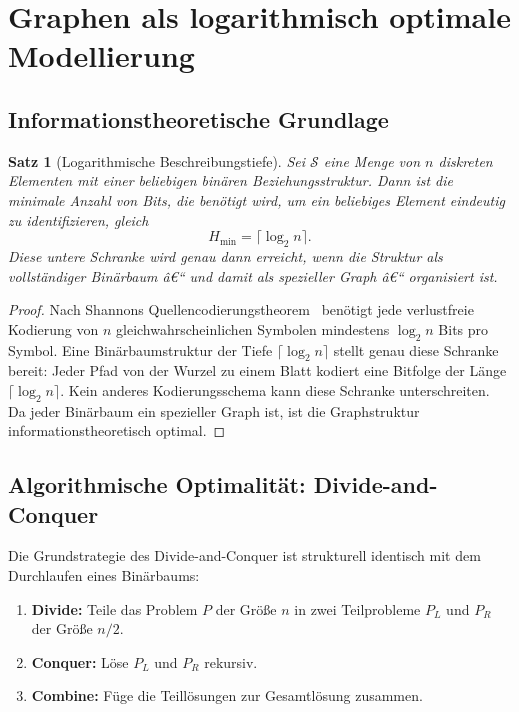 ﻿\documentclass[12pt,a4paper,twoside]{article}
\theoremstyle{definition}
\theoremstyle{plain}
\newtheorem{theorem}{Satz}[section]
\theoremstyle{remark}
\begin{document}
\section{Graphen als logarithmisch optimale Modellierung}
\label{sec:log_beweis}

\subsection{Informationstheoretische Grundlage}

\begin{theorem}[Logarithmische Beschreibungstiefe]
\label{thm:log}
Sei $\mathcal{S}$ eine Menge von $n$ diskreten Elementen mit
einer beliebigen binären Beziehungsstruktur.  Dann ist die
minimale Anzahl von Bits, die benötigt wird, um ein beliebiges
Element eindeutig zu identifizieren, gleich
\[
  H_{\min} = \lceil \log_2 n \rceil.
\]
Diese untere Schranke wird genau dann erreicht, wenn die Struktur
als vollständiger Binärbaum â€“ und damit als spezieller Graph â€“
organisiert ist.
\end{theorem}

\begin{proof}
Nach Shannons Quellencodierungstheorem~\cite{Shannon1948} benötigt
jede verlustfreie Kodierung von $n$ gleichwahrscheinlichen Symbolen
mindestens $\log_2 n$ Bits pro Symbol.  Eine Binärbaumstruktur
der Tiefe $\lceil \log_2 n \rceil$ stellt genau diese Schranke
bereit: Jeder Pfad von der Wurzel zu einem Blatt kodiert eine
Bitfolge der Länge $\lceil \log_2 n \rceil$.  Kein anderes
Kodierungsschema kann diese Schranke unterschreiten.
Da jeder Binärbaum ein spezieller Graph ist, ist die
Graphstruktur informationstheoretisch optimal.
\end{proof}

\subsection{Algorithmische Optimalität: Divide-and-Conquer}

Die Grundstrategie des Divide-and-Conquer ist strukturell identisch
mit dem Durchlaufen eines Binärbaums:

\begin{enumerate}[label=\textbf{(\arabic*)}]
  \item \textbf{Divide:} Teile das Problem $P$ der Größe $n$ in
        zwei Teilprobleme $P_L$ und $P_R$ der Größe $n/2$.
  \item \textbf{Conquer:} Löse $P_L$ und $P_R$ rekursiv.
  \item \textbf{Combine:} Füge die Teillösungen zur Gesamtlösung
        zusammen.
\end{enumerate}
\end{document}
